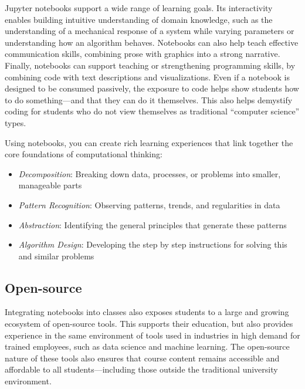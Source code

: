 \documentclass[]{book}
\providecommand{\tightlist}{%
  \setlength{\itemsep}{0pt}\setlength{\parskip}{0pt}}
\begin{document}
Jupyter notebooks support a wide range of learning goals. Its interactivity
enables building intuitive understanding of domain knowledge, such as the
understanding of a mechanical response of a system while varying parameters or
understanding how an algorithm behaves. Notebooks can also help teach effective
communication skills, combining prose with graphics into a strong narrative.
Finally, notebooks can support teaching or strengthening programming skills, by
combining code with text descriptions and visualizations. Even if a notebook is
designed to be consumed passively, the exposure to code helps show students how
to do something---and that they can do it themselves. This also helps demystify
coding for students who do not view themselves as traditional ``computer science''
types.

Using notebooks, you can create rich learning experiences that link together the
core foundations of computational thinking:

\begin{itemize}
\tightlist
\item
  \emph{Decomposition}: Breaking down data, processes, or problems into smaller, manageable parts
\item
  \emph{Pattern Recognition}: Observing patterns, trends, and regularities in data
\item
  \emph{Abstraction}: Identifying the general principles that generate these patterns
\item
  \emph{Algorithm Design}: Developing the step by step instructions for solving
  this and similar problems
\end{itemize}

\hypertarget{open-source}{%
\subsection{Open-source}\label{open-source}}

Integrating notebooks into classes also exposes students to a large and growing
ecosystem of open-source tools. This supports their education, but also provides
experience in the same environment of tools used in industries in high demand
for trained employees, such as data science and machine learning. The
open-source nature of these tools also ensures that course content remains
accessible and affordable to all students---including those outside the
traditional university environment.
\end{document}

